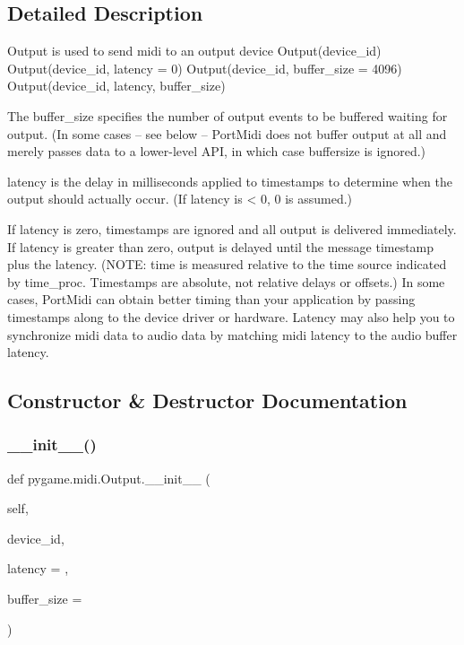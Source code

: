 \subsection{Detailed Description}
\begin{DoxyVerb}Output is used to send midi to an output device
Output(device_id)
Output(device_id, latency = 0)
Output(device_id, buffer_size = 4096)
Output(device_id, latency, buffer_size)

The buffer_size specifies the number of output events to be
buffered waiting for output.  (In some cases -- see below --
PortMidi does not buffer output at all and merely passes data
to a lower-level API, in which case buffersize is ignored.)

latency is the delay in milliseconds applied to timestamps to determine
when the output should actually occur. (If latency is < 0, 0 is
assumed.)

If latency is zero, timestamps are ignored and all output is delivered
immediately. If latency is greater than zero, output is delayed until
the message timestamp plus the latency. (NOTE: time is measured
relative to the time source indicated by time_proc. Timestamps are
absolute, not relative delays or offsets.) In some cases, PortMidi
can obtain better timing than your application by passing timestamps
along to the device driver or hardware. Latency may also help you
to synchronize midi data to audio data by matching midi latency to
the audio buffer latency.\end{DoxyVerb}
 

\subsection{Constructor \& Destructor Documentation}
\mbox{\label{classpygame_1_1midi_1_1_output_a7e45be4830f504abe9c60194eda9ebe0}} 
\subsubsection{\texorpdfstring{\+\_\+\+\_\+init\+\_\+\+\_\+()}{\_\_init\_\_()}}
{\footnotesize\ttfamily def pygame.\+midi.\+Output.\+\_\+\+\_\+init\+\_\+\+\_\+ (\begin{DoxyParamCaption}\item[{}]{self,  }\item[{}]{device\+\_\+id,  }\item[{}]{latency = {},  }\item[{}]{buffer\+\_\+size = {} }\end{DoxyParamCaption})}


